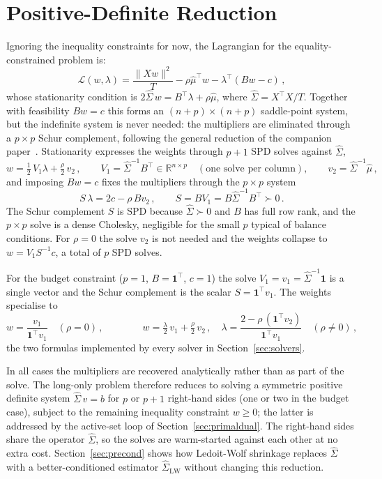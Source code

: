 \section{Positive-Definite Reduction}\label{sec:pd}

Ignoring the inequality constraints for now, the Lagrangian for the equality-constrained problem is:
\[
\mathcal{L}(w, \lambda) = \frac{\|Xw\|^2}{T} - \rho\hat\mu^\top w - \lambda^\top(Bw - c)\,,
\]
whose stationarity condition is
$2\hat\Sigma\, w = B^\top\lambda + \rho\hat \mu$, where $\hat\Sigma = X^\top X/T$.
Together with feasibility $Bw = c$ this forms an $(n+p)\times(n+p)$ saddle-point system,
but the indefinite system is never needed: the multipliers are eliminated through a
$p\times p$ Schur complement, following the general reduction of the companion
paper~\cite{schmelzer2026nncg}. Stationarity expresses the weights through $p+1$ SPD
solves against $\hat\Sigma$,
\[
  w = \tfrac{1}{2}\,V_1\lambda + \tfrac{\rho}{2}\,v_2\,,
  \qquad
  V_1 = \hat\Sigma^{-1}B^\top \in \mathbb{R}^{n\times p}
  \quad(\text{one solve per column}),
  \qquad
  v_2 = \hat\Sigma^{-1}\hat\mu\,,
\]
and imposing $Bw = c$ fixes the multipliers through the $p\times p$ system
\[
  S\,\lambda = 2c - \rho\,Bv_2\,,
  \qquad
  S = BV_1 = B\hat\Sigma^{-1}B^\top \succ 0\,.
\]
The Schur complement $S$ is SPD because $\hat\Sigma \succ 0$ and $B$ has full row rank,
and the $p\times p$ solve is a dense Cholesky, negligible for the small $p$ typical of
balance conditions. For $\rho = 0$ the solve $v_2$ is not needed and the weights collapse
to $w = V_1 S^{-1} c$, a total of $p$ SPD solves.

For the budget constraint ($p = 1$, $B = \mathbf{1}^\top$, $c = 1$) the solve
$V_1 = v_1 = \hat\Sigma^{-1}\mathbf{1}$ is a single vector and the Schur complement is the
scalar $S = \mathbf{1}^\top v_1$. The weights specialise to
\[
  w = \frac{v_1}{\mathbf{1}^\top v_1} \quad (\rho = 0)\,,
  \qquad\qquad
  w = \tfrac{\lambda}{2}\,v_1 + \tfrac{\rho}{2}\,v_2\,,
  \quad
  \lambda = \frac{2 - \rho\,(\mathbf{1}^\top v_2)}{\mathbf{1}^\top v_1} \quad (\rho \neq 0)\,,
\]
the two formulas implemented by every solver in Section~\ref{sec:solvers}.

In all cases the multipliers are recovered analytically rather than as part of the solve.
The long-only problem therefore reduces to solving a symmetric positive definite system
$\hat\Sigma\,v = b$ for $p$ or $p+1$ right-hand sides (one or two in the budget case),
subject to the remaining inequality
constraint $w \geq 0$; the latter is addressed by the active-set loop of
Section~\ref{sec:primaldual}. The right-hand sides share the operator
$\hat\Sigma$, so the solves are warm-started against each other at no extra cost.
Section~\ref{sec:precond} shows how Ledoit-Wolf
shrinkage replaces $\hat\Sigma$ with a better-conditioned estimator $\hat\Sigma_{\mathrm{LW}}$
without changing this reduction.
